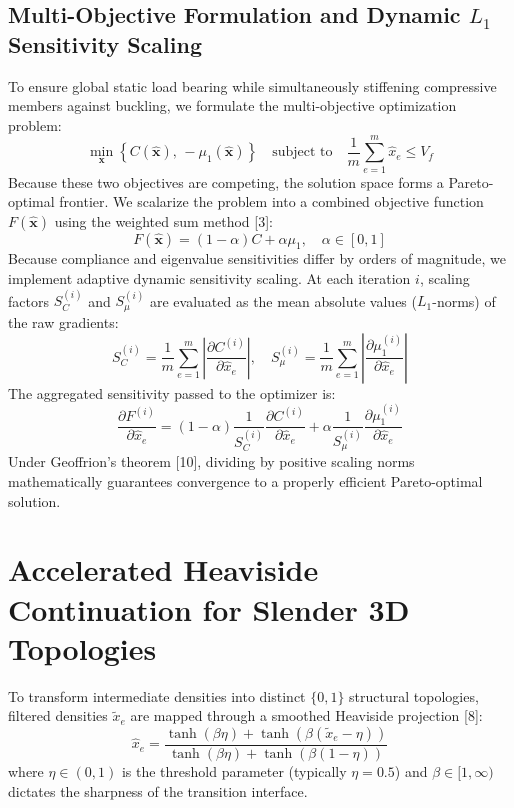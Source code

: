 \documentclass[11pt, a4paper]{article}
\begin{document}
\subsection{Multi-Objective Formulation and Dynamic \texorpdfstring{$L_1$}{L1} Sensitivity Scaling}
To ensure global static load bearing while simultaneously stiffening compressive members against buckling, we formulate the multi-objective optimization problem:
\begin{equation}
\min_{\mathbf{x}} \left\{ C(\hat{\mathbf{x}}), \, -\mu_1(\hat{\mathbf{x}}) \right\} \quad \text{subject to} \quad \frac{1}{m}\sum_{e=1}^m \hat{x}_e \le V_f
\label{eq:multiobj_prob}
\end{equation}
Because these two objectives are competing, the solution space forms a Pareto-optimal frontier. We scalarize the problem into a combined objective function $F(\hat{\mathbf{x}})$ using the weighted sum method [3]:
\begin{equation}
F(\hat{\mathbf{x}}) = (1 - \alpha) C + \alpha \mu_1, \quad \alpha \in [0, 1]
\label{eq:scalarized_obj}
\end{equation}
Because compliance and eigenvalue sensitivities differ by orders of magnitude, we implement adaptive dynamic sensitivity scaling. At each iteration $i$, scaling factors $S_C^{(i)}$ and $S_\mu^{(i)}$ are evaluated as the mean absolute values ($L_1$-norms) of the raw gradients:
\begin{equation}
S_C^{(i)} = \frac{1}{m}\sum_{e=1}^m \left| \frac{\partial C^{(i)}}{\partial \hat{x}_e} \right|, \quad
S_\mu^{(i)} = \frac{1}{m}\sum_{e=1}^m \left| \frac{\partial \mu_1^{(i)}}{\partial \hat{x}_e} \right|
\end{equation}
The aggregated sensitivity passed to the optimizer is:
\begin{equation}
\frac{\partial F^{(i)}}{\partial \hat{x}_e} = (1 - \alpha) \frac{1}{S_C^{(i)}} \frac{\partial C^{(i)}}{\partial \hat{x}_e} + \alpha \frac{1}{S_\mu^{(i)}} \frac{\partial \mu_1^{(i)}}{\partial \hat{x}_e}
\end{equation}
Under Geoffrion's theorem [10], dividing by positive scaling norms mathematically guarantees convergence to a properly efficient Pareto-optimal solution.

\section{Accelerated Heaviside Continuation for Slender 3D Topologies}
To transform intermediate densities into distinct $\{0, 1\}$ structural topologies, filtered densities $\tilde{x}_e$ are mapped through a smoothed Heaviside projection [8]:
\begin{equation}
\hat{x}_e = \frac{\tanh(\beta \eta) + \tanh(\beta (\tilde{x}_e - \eta))}{\tanh(\beta \eta) + \tanh(\beta (1 - \eta))}
\end{equation}
where $\eta \in (0, 1)$ is the threshold parameter (typically $\eta = 0.5$) and $\beta \in [1, \infty)$ dictates the sharpness of the transition interface.
\end{document}

